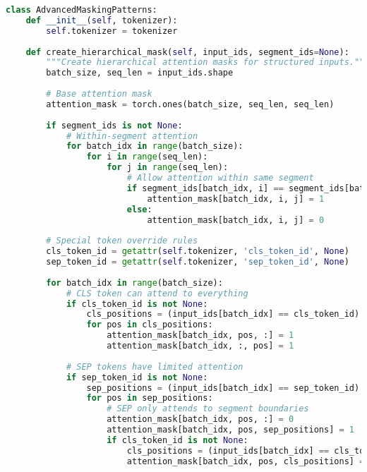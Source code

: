 \begin{lstlisting}[language=Python, caption=Advanced attention masking patterns]
class AdvancedMaskingPatterns:
    def __init__(self, tokenizer):
        self.tokenizer = tokenizer
        
    def create_hierarchical_mask(self, input_ids, segment_ids=None):
        """Create hierarchical attention masks for structured inputs."""
        batch_size, seq_len = input_ids.shape
        
        # Base attention mask
        attention_mask = torch.ones(batch_size, seq_len, seq_len)
        
        if segment_ids is not None:
            # Within-segment attention
            for batch_idx in range(batch_size):
                for i in range(seq_len):
                    for j in range(seq_len):
                        # Allow attention within same segment
                        if segment_ids[batch_idx, i] == segment_ids[batch_idx, j]:
                            attention_mask[batch_idx, i, j] = 1
                        else:
                            attention_mask[batch_idx, i, j] = 0
                            
        # Special token override rules
        cls_token_id = getattr(self.tokenizer, 'cls_token_id', None)
        sep_token_id = getattr(self.tokenizer, 'sep_token_id', None)
        
        for batch_idx in range(batch_size):
            # CLS token can attend to everything
            if cls_token_id is not None:
                cls_positions = (input_ids[batch_idx] == cls_token_id).nonzero(as_tuple=True)[0]
                for pos in cls_positions:
                    attention_mask[batch_idx, pos, :] = 1
                    attention_mask[batch_idx, :, pos] = 1
                    
            # SEP tokens have limited attention
            if sep_token_id is not None:
                sep_positions = (input_ids[batch_idx] == sep_token_id).nonzero(as_tuple=True)[0]
                for pos in sep_positions:
                    # SEP only attends to segment boundaries
                    attention_mask[batch_idx, pos, :] = 0
                    attention_mask[batch_idx, pos, sep_positions] = 1
                    if cls_token_id is not None:
                        cls_positions = (input_ids[batch_idx] == cls_token_id).nonzero(as_tuple=True)[0]
                        attention_mask[batch_idx, pos, cls_positions] = 1
                        

\end{lstlisting}
